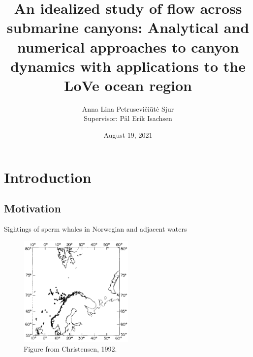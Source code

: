 \documentclass{beamer}
\title[An idealized study of flow across submarine canyons]{An idealized study of flow across submarine canyons: \small Analytical and numerical approaches to canyon dynamics with applications to the LoVe ocean region} %
\author{Anna Lina Petrusevi\v ci\=ut\.e Sjur\\
Supervisor: Pål Erik Isachsen} %
\institute[UiO] %
{
University of Oslo \\ %
\medskip
}
\date{August 19, 2021} %
\begin{document}
{
\begin{frame}
\titlepage %
\end{frame}
}



\section{Introduction} %

\subsection{Motivation} %
\begin{frame}{Sightings of sperm whales in Norwegian and adjacent waters}
    \begin{figure}
    \centering
    \includegraphics[width = 0.5\textwidth]{figures/whalesitings_large.pdf}
    \caption{Figure from Christensen, 1992.} %
\end{figure}
\end{frame}
\end{document}
